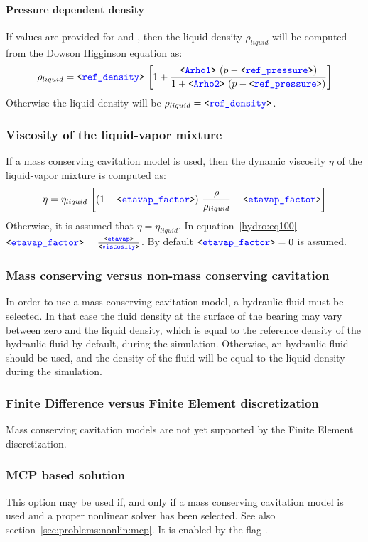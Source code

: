 \paragraph{Pressure dependent density}
If values are provided for  and , then the liquid density $\rho_{liquid}$ will be computed from the Dowson Higginson equation\cite{DIRKBARTEL2010} as:
\begin{equation}
\rho_{liquid}=\texttt{<\textcolor{blue}{ref\_density}>}\,\left[1 + \frac{\texttt{<\textcolor{blue}{Arho1}>}\,\left(p - \texttt{<\textcolor{blue}{ref\_pressure}>}\right)}{1 + \texttt{<\textcolor{blue}{Arho2}>}\,\left(p - \texttt{<\textcolor{blue}{ref\_pressure}>}\right)}\right]
\end{equation}
Otherwise the liquid density will be $\rho_{liquid}=\texttt{<\textcolor{blue}{ref\_density}>}$.
\subsubsection{Viscosity of the liquid-vapor mixture}
If a mass conserving cavitation model is used, then the dynamic viscosity $\eta$ of the liquid-vapor mixture is computed as:
\begin{equation}
\label{hydro:eq100}
\eta=\eta_{liquid}\,\left[\left(1 - \texttt{<\textcolor{blue}{etavap\_factor}>}\right)\,\frac{\rho}{\rho_{liquid}} + \texttt{<\textcolor{blue}{etavap\_factor}>}\right]
\end{equation}
Otherwise, it is assumed that $\eta=\eta_{liquid}$. In equation~\ref{hydro:eq100} $\texttt{<\textcolor{blue}{etavap\_factor}>}=\frac{\texttt{<\textcolor{blue}{etavap}>}}{\texttt{<\textcolor{blue}{viscosity}>}}$. By default $\texttt{<\textcolor{blue}{etavap\_factor}>}=0$ is assumed.
\subsubsection{Mass conserving versus non-mass conserving cavitation}
In order to use a mass conserving cavitation model, a  hydraulic fluid must be selected. In that case the fluid density at the surface of the bearing may vary between zero and the liquid density, which is equal to the reference density of the hydraulic fluid by default, during the simulation. Otherwise, an  hydraulic fluid should be used, and the density of the fluid will be equal to the liquid density during the simulation.
\subsubsection{Finite Difference versus Finite Element discretization}
Mass conserving cavitation models are not yet supported by the Finite Element discretization.
\subsubsection{MCP based solution}
This option may be used if, and only if a mass conserving cavitation model is used and a proper nonlinear solver has been selected. See also section~\ref{sec:problems:nonlin:mcp}. It is enabled by the flag .
